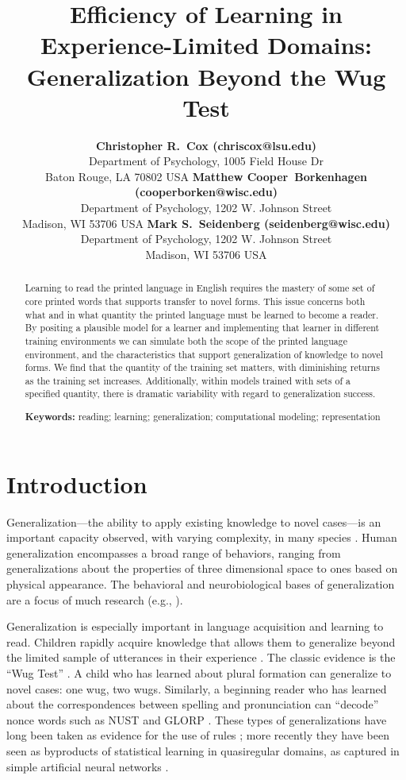 \documentclass[10pt,letterpaper]{article}
\title{Efficiency of Learning in Experience-Limited Domains:\\Generalization Beyond the Wug Test}
\author{%
	{\large \bf Christopher R.~Cox (chriscox@lsu.edu)} \\
  	Department of Psychology, 1005 Field House Dr \\
  	Baton Rouge, LA 70802 USA
  \AND%
	{\large \bf Matthew Cooper~Borkenhagen (cooperborken@wisc.edu)} \\
	Department of Psychology, 1202 W. Johnson Street \\
	Madison, WI 53706 USA
  \AND%
	{\large \bf Mark S.~Seidenberg (seidenberg@wisc.edu)} \\
	Department of Psychology, 1202 W. Johnson Street \\
	Madison, WI 53706 USA
}
\newcommand{\exword}[1]{\MakeUppercase{#1}}
\begin{document}
\maketitle


\begin{abstract}
Learning to read the printed language in English requires the mastery of some set of core printed words that supports transfer to novel forms. This issue concerns both what and in what quantity the printed language must be learned to become a reader. By positing a plausible model for a learner and implementing that learner in different training environments we can simulate both the scope of the printed language environment, and the characteristics that support generalization of knowledge to novel forms. We find that the quantity of the training set matters, with diminishing returns as the training set increases. Additionally, within models trained with sets of a specified quantity, there is dramatic variability with regard to generalization success.

\textbf{Keywords:} 
reading; learning; generalization; computational modeling; representation
\end{abstract}


\section{Introduction}

Generalization---the ability to apply existing knowledge to novel cases---is an important capacity observed, with varying complexity, in many species \cite{Santolin2018}. Human generalization encompasses a broad range of behaviors, ranging from generalizations about the properties of three dimensional space to ones based on physical appearance.  The behavioral and neurobiological bases of generalization are a focus of much research (e.g., ).

Generalization is especially important in language acquisition and learning to read. Children rapidly acquire knowledge that allows them to generalize beyond the limited sample of utterances in their experience \cite{Chomsky1965}. The classic evidence is the ``Wug Test'' \cite{Berko1958}. A child who has learned about plural formation can generalize to novel cases:  one wug, two wugs.  Similarly, a beginning reader who has learned about the correspondences between spelling and pronunciation can ``decode'' nonce words such as \exword{nust} and \exword{glorp} \cite{Seidenberg1989}.  These types of generalizations have long been taken as evidence for the use of rules \cite{Pinker1991}; more recently they have been seen as byproducts of statistical learning in quasiregular domains, as captured in simple artificial neural networks \cite{Seidenberg2014}.
\end{document}
